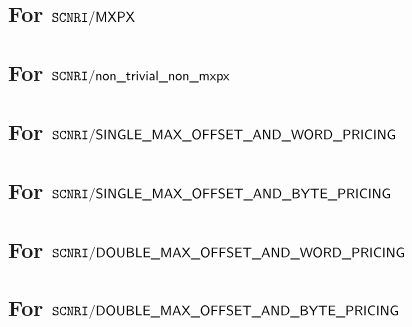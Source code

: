 \subsection{For $\texttt{SCNRI}\textsf{/}{\textsf{MXPX}}$}                                \label{mxp: computation: mxpx}                                
\subsection{For $\texttt{SCNRI}\textsf{/}{\textsf{non\_trivial\_non\_mxpx}}$}                \label{mxp: computation: nontrivial_unexceptional}                                                                        
\subsection{For $\texttt{SCNRI}\textsf{/}{\textsf{SINGLE\_MAX\_OFFSET\_AND\_WORD\_PRICING}}$}       \label{mxp: computation: single_max_offset_word}              
\subsection{For $\texttt{SCNRI}\textsf{/}{\textsf{SINGLE\_MAX\_OFFSET\_AND\_BYTE\_PRICING}}$}       \label{mxp: computation: single_max_offset_byte}                          
\subsection{For $\texttt{SCNRI}\textsf{/}{\textsf{DOUBLE\_MAX\_OFFSET\_AND\_WORD\_PRICING}}$}       \label{mxp: computation: double_max_offset_word}              
\subsection{For $\texttt{SCNRI}\textsf{/}{\textsf{DOUBLE\_MAX\_OFFSET\_AND\_BYTE\_PRICING}}$}       \label{mxp: computation: double_max_offset_byte}              
